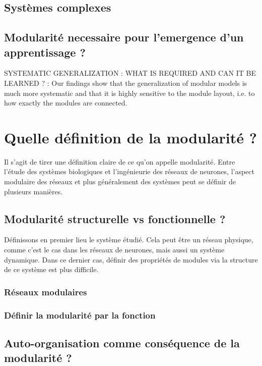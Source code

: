 \subsection{Systèmes complexes}

\subsection{Modularité necessaire pour l'emergence d'un apprentissage ? }

SYSTEMATIC GENERALIZATION : WHAT IS REQUIRED
AND CAN IT BE LEARNED ? : 
Our findings show that the generalization of modular models is much more systematic and that it is highly sensitive to the module layout, i.e. to how exactly the modules are connected.

\section{Quelle définition de la modularité ?}

Il s'agit de tirer une définition claire de ce qu'on appelle modularité. Entre l'étude des systèmes biologiques et l'ingénieurie des réseaux de neurones, l'aspect modulaire des réseaux et plus généralement des systèmes peut se définir de plusieurs manières. 

	\subsection{Modularité structurelle vs fonctionnelle ? }
	
	Définissons en premier lieu le système étudié. Cela peut être un réseau physique, comme c'est le cas dans les réseaux de neurones, mais aussi un système dynamique. Dans ce dernier cas, définir des propriétés de modules via la structure de ce système est plus difficile.

	\subsubsection{Réseaux modulaires}
	

	\subsubsection{Définir la modularité par la fonction}
	

	\subsection{Auto-organisation comme conséquence de la modularité ? }


